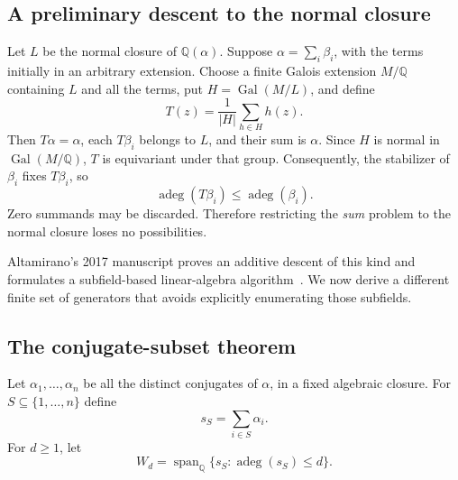 \documentclass[11pt,letterpaper]{article}
\theoremstyle{definition}\newtheorem{definition}[theorem]{Definition}
\theoremstyle{remark}\newtheorem{remark}[theorem]{Remark}
\newcommand{\Q}{\mathbb Q}
\newcommand{\Gal}{\operatorname{Gal}}
\newcommand{\Span}{\operatorname{span}}
\newcommand{\ad}{\operatorname{adeg}}
\begin{document}
\subsection{A preliminary descent to the normal closure}
Let $L$ be the normal closure of $\Q(\alpha)$. Suppose
$\alpha=\sum_i\beta_i$, with the terms initially in an arbitrary extension. Choose a finite Galois extension $M/\Q$ containing $L$ and all the terms, put $H=\Gal(M/L)$, and define
\begin{equation}
 T(z)=\frac1{|H|}\sum_{h\in H}h(z).
 \label{eq:avgtrace}
\end{equation}
Then $T\alpha=\alpha$, each $T\beta_i$ belongs to $L$, and their sum is $\alpha$. Since $H$ is normal in $\Gal(M/\Q)$, $T$ is equivariant under that group. Consequently, the stabilizer of $\beta_i$ fixes $T\beta_i$, so
\[
 \ad(T\beta_i)\le\ad(\beta_i).
\]
Zero summands may be discarded. Therefore restricting the \emph{sum} problem to the normal closure loses no possibilities.

Altamirano's 2017 manuscript proves an additive descent of this kind and formulates a subfield-based linear-algebra algorithm~\cite{altamirano}. We now derive a different finite set of generators that avoids explicitly enumerating those subfields.

\subsection{The conjugate-subset theorem}
Let $\alpha_1,\ldots,\alpha_n$ be all the distinct conjugates of $\alpha$, in a fixed algebraic closure. For $S\subseteq\{1,\ldots,n\}$ define
\[
 s_S=\sum_{i\in S}\alpha_i.
\]
For $d\ge1$, let
\begin{equation}
 W_d=\Span_\Q\{s_S:\ad(s_S)\le d\}.
 \label{eq:Wd}
\end{equation}
\end{document}

